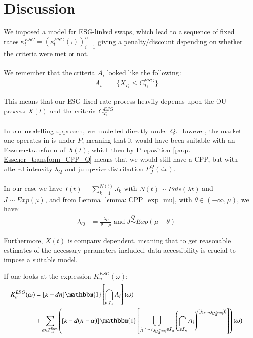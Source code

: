 \chapter{Discussion}

We imposed a model for ESG-linked swaps, which lead to a sequence of fixed rates $\kappa_{t}^{ESG}  = (\kappa_{t}^{ESG}(i))_{i=1}^{n}$ giving a penalty/discount depending on whether the criteria were met or not.
\\~\\ 
We remember that the criteria $A_{i}$ looked like the following:
\begin{align*}
A_{i} &= \{X_{T_{i}} \leq C_{T_{i}}^{ESG}\}    
\end{align*}

This means that our ESG-fixed rate process heavily depends upon the OU-process $X(t)$ and the criteria $C_{T_{i}}^{ESG}$. 
\\~\\
In our modelling approach, we modelled directly under $Q$. However, the market one operates in is under $P$, meaning that it would have been suitable with an Esscher-transform of $X(t)$, which then by  Proposition \ref{prop: Esscher_transform_CPP_Q} means that we would still have a CPP, but with altered intensity $\lambda_{Q}$ and jump-size distribution $F_{J}^{Q}(dx)$.
\\~\\
In our case we have $I(t) = \sum_{k=1}^{N(t)}J_{k}$ with $N(t) \sim Pois(\lambda t)$ and 
$J\sim Exp(\mu)$, and from Lemma \ref{lemma: CPP_exp_mu}, with $\theta \in (-\infty, \mu)$, we have:
\begin{align*}
\lambda_{Q} &= \frac{\lambda \mu}{\theta - \mu} \;\text{and}\;
J \stackrel{Q}{\sim} Exp(\mu - \theta)
\end{align*}

Furthermore, $X(t)$ is company dependent, meaning that to get reasonable estimates of the necessary parameters included, data accessibility is crucial to impose a suitable model. 

\newpage 
If one looks at the expression $K_{n}^{ESG}(\omega)$: 
\begin{align*}
K_{n}^{ESG}(\omega) &= 
[\kappa -dn]\mathbbm{1}\left[
\bigcap_{i\in \mathcal{I}_{n}}A_{i}
\right](\omega) \\ 
&+ 
\sum_{\alpha \in \mathcal{I}_{2n}^{Even}}
\left(
[\kappa -d(n-\alpha)]\mathbbm{1}\left[
\bigcup_{
j_{1}\neq \dots \neq j_{|\mathcal{I}_{\alpha}^{Even}|}
\in \mathcal{I}_{n}
}\left(
\bigcap_{i\in \mathcal{I}_{n}}A_{i}
\right)^{
\{
(j_{1}, \dots , j_{|\mathcal{I}_{\alpha}^{Even}|})
\}
}
\right]
\right)(\omega) 
\end{align*}

